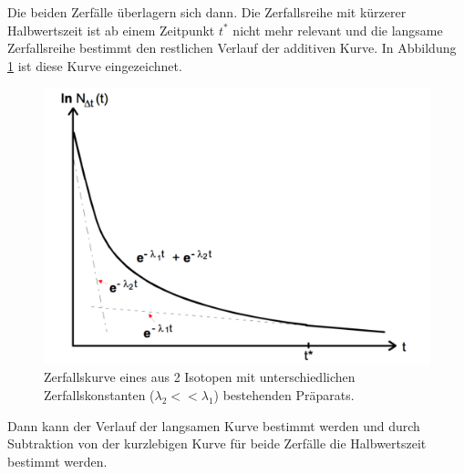 Die beiden Zerfälle überlagern sich dann. Die Zerfallsreihe mit kürzerer Halbwertszeit
ist ab einem Zeitpunkt $t^*$ nicht mehr relevant und die langsame Zerfallsreihe bestimmt den restlichen Verlauf
der additiven Kurve. In Abbildung \ref{fig:additivekurve} ist diese Kurve eingezeichnet.%
\begin{figure}[h]
  \centering
  \includegraphics[width = \textwidth]{Pics/additivekurve.pdf}
  \caption{Zerfallskurve eines aus 2 Isotopen mit unterschiedlichen Zerfallskonstanten
   ($\lambda_2 << \lambda_1$) bestehenden Präparats.\cite{anleitung}}
  \label{fig:additivekurve}
\end{figure}
Dann kann der Verlauf der langsamen Kurve bestimmt werden und durch Subtraktion
von der kurzlebigen Kurve für beide Zerfälle die Halbwertszeit bestimmt werden.
